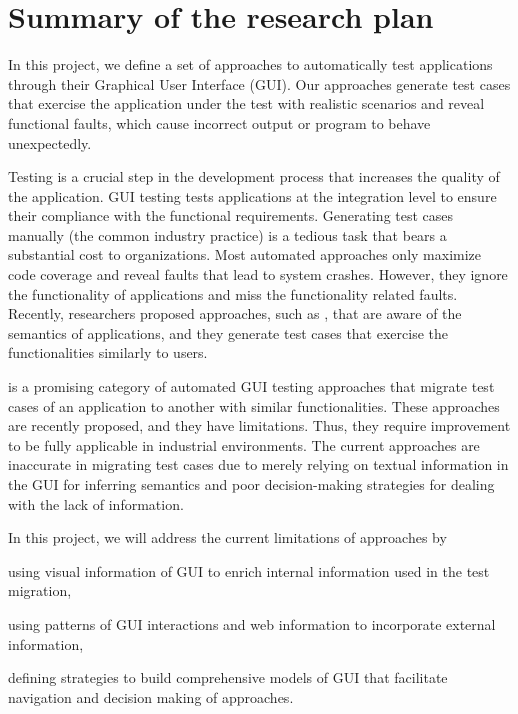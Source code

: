 	\section{Summary of the research plan}


In this project, we define a set of approaches to automatically test applications through their Graphical User Interface (GUI). 
Our approaches generate test cases that exercise the application under the test with realistic scenarios and reveal functional faults, which cause incorrect output or program to behave unexpectedly. 


Testing is a crucial step in the development process that increases the quality of the application.
GUI testing tests applications at the integration level to ensure their compliance with the functional requirements. 
Generating test cases manually (the common industry practice) is a tedious task that bears a substantial cost to organizations. Most automated approaches only maximize code coverage and reveal faults that lead to system crashes.
However, they ignore the functionality of applications and miss the functionality related faults. 
Recently, researchers proposed approaches, such as \testreuse, that are aware of the semantics of applications, and they generate test cases that exercise the functionalities similarly to users. 


\testreuse is a promising category of automated GUI testing approaches that migrate test cases of an application to another with similar functionalities. These approaches are recently proposed, and they have limitations. 
Thus, they require improvement to be fully applicable in industrial environments. The current \testreuse approaches are inaccurate in migrating test cases due to merely relying on textual information in the GUI for inferring semantics and poor decision-making strategies for dealing with the lack of information. 


In this project, we will address the current limitations of \testreuse approaches by
\begin{inparaenum}[(i)]
\item using visual information of GUI to enrich internal information used in the test migration,
\item using patterns of GUI interactions and web information to incorporate external information,
\item defining strategies to build comprehensive models of GUI that facilitate navigation and decision making of \testreuse approaches.
\end{inparaenum}

